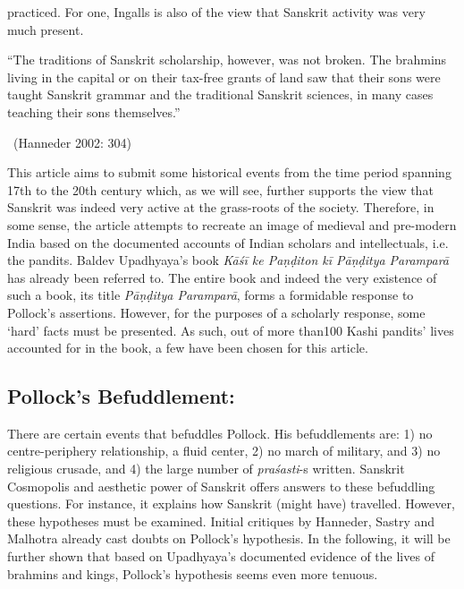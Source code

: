 \eject

 practiced. For one, Ingalls is also of the view that Sanskrit activity was very much present.

\begin{myquote}
“The traditions of Sanskrit scholarship, however, was not broken. The brahmins living in the capital or on their tax-free grants of land saw that their sons were taught Sanskrit grammar and the traditional Sanskrit sciences, in many cases teaching their sons themselves.” 

~\hfill (Hanneder 2002: 304)
\end{myquote}

This article aims to submit some historical events from the time period spanning 17th to the 20th century which, as we will see, further supports the view that Sanskrit was indeed very active at the grass-roots of the society. Therefore, in some sense, the article attempts to recreate an image of medieval and pre-modern India based on the documented accounts of Indian scholars and intellectuals, i.e. the pandits. Baldev Upadhyaya’s book \textit{Kāśī ke Paṇḍiton kī Pāṇḍitya Paramparā} has already been referred to. The entire book and indeed the very existence of such a book, its title \textit{Pāṇḍitya Paramparā}, forms a formidable response to Pollock’s assertions. However, for the purposes of a scholarly response, some ‘hard’ facts must be presented. As such, out of more than100 Kashi pandits’ lives accounted for in the book, a few have been chosen for this article.

\vspace{-.3cm}

\subsection*{Pollock’s Befuddlement:}

There are certain events that befuddles Pollock. His befuddlements are: 1) no centre-periphery relationship, a fluid center, 2) no march of military, and 3) no religious crusade, and 4) the large number of \textit{praśasti}-s written. Sanskrit Cosmopolis and aesthetic power of Sanskrit offers answers to these befuddling questions. For instance, it explains how Sanskrit (might have) travelled. However, these hypotheses must be examined. Initial critiques by Hanneder, Sastry and Malhotra already cast doubts on Pollock’s hypothesis. In the following, it will be further shown that based on Upadhyaya’s documented evidence of the lives of brahmins and kings, Pollock’s hypothesis seems even more tenuous.

